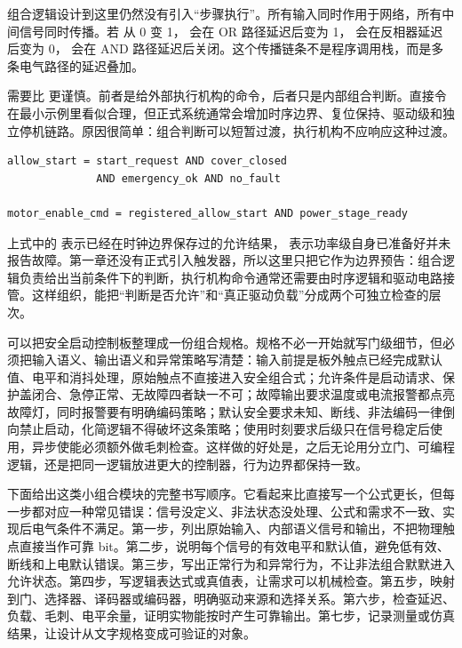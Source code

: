 组合逻辑设计到这里仍然没有引入“步骤执行”。所有输入同时作用于网络，所有中间信号同时传播。若  从 0 变 1， 会在 OR 路径延迟后变为 1， 会在反相器延迟后变为 0， 会在 AND 路径延迟后关闭。这个传播链条不是程序调用栈，而是多条电气路径的延迟叠加。

 需要比  更谨慎。前者是给外部执行机构的命令，后者只是内部组合判断。直接令  在最小示例里看似合理，但正式系统通常会增加时序边界、复位保持、驱动级和独立停机链路。原因很简单：组合判断可以短暂过渡，执行机构不应响应这种过渡。

\begin{lstlisting}
allow_start = start_request AND cover_closed
              AND emergency_ok AND no_fault

motor_enable_cmd = registered_allow_start AND power_stage_ready
\end{lstlisting}

上式中的  表示已经在时钟边界保存过的允许结果， 表示功率级自身已准备好并未报告故障。第一章还没有正式引入触发器，所以这里只把它作为边界预告：组合逻辑负责给出当前条件下的判断，执行机构命令通常还需要由时序逻辑和驱动电路接管。这样组织，能把“判断是否允许”和“真正驱动负载”分成两个可独立检查的层次。

可以把安全启动控制板整理成一份组合规格。规格不必一开始就写门级细节，但必须把输入语义、输出语义和异常策略写清楚：输入前提是板外触点已经完成默认值、电平和消抖处理，原始触点不直接进入安全组合式；允许条件是启动请求、保护盖闭合、急停正常、无故障四者缺一不可；故障输出要求温度或电流报警都点亮故障灯，同时报警要有明确编码策略；默认安全要求未知、断线、非法编码一律倒向禁止启动，化简逻辑不得破坏这条策略；使用时刻要求后级只在信号稳定后使用，异步使能必须额外做毛刺检查。这样做的好处是，之后无论用分立门、可编程逻辑，还是把同一逻辑放进更大的控制器，行为边界都保持一致。

下面给出这类小组合模块的完整书写顺序。它看起来比直接写一个公式更长，但每一步都对应一种常见错误：信号没定义、非法状态没处理、公式和需求不一致、实现后电气条件不满足。第一步，列出原始输入、内部语义信号和输出，不把物理触点直接当作可靠 bit。第二步，说明每个信号的有效电平和默认值，避免低有效、断线和上电默认错误。第三步，写出正常行为和异常行为，不让非法组合默默进入允许状态。第四步，写逻辑表达式或真值表，让需求可以机械检查。第五步，映射到门、选择器、译码器或编码器，明确驱动来源和选择关系。第六步，检查延迟、负载、毛刺、电平余量，证明实物能按时产生可靠输出。第七步，记录测量或仿真结果，让设计从文字规格变成可验证的对象。

